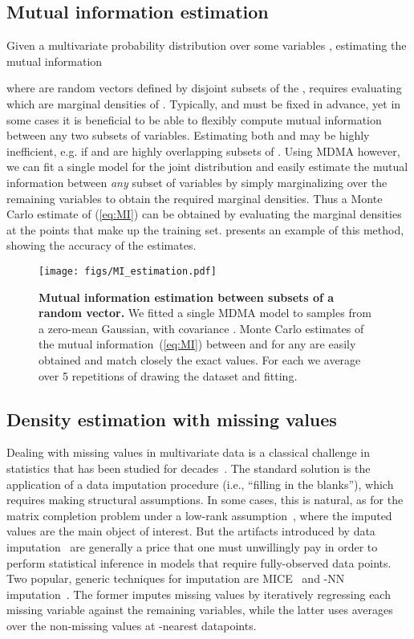 \documentclass{article}
\begin{document}
\subsection{Mutual information estimation}
Given a multivariate probability distribution over some variables , estimating the mutual information 

where  are random vectors defined by disjoint subsets of the , requires evaluating  which are marginal densities of . Typically,  and  must be fixed in advance, yet in some cases it is beneficial to be able to flexibly compute mutual information between any two subsets of variables. Estimating both  and  may be highly inefficient, e.g. if  and  are highly overlapping subsets of . 
Using MDMA however, we can fit a single model for the joint distribution
and easily estimate the mutual information between \textit{any} subset of variables by simply marginalizing over the remaining variables to obtain the required marginal densities. 
Thus a Monte Carlo estimate of (\ref{eq:MI}) can be obtained by evaluating the marginal densities at the points that make up the training set. 
 presents an example of this method, showing the accuracy of the estimates.
\begin{SCfigure}
    \centering
    \texttt{[image: figs/MI\_estimation.pdf]}
    \caption{\textbf{Mutual information estimation between subsets of a random vector.}
    We fitted a single MDMA model to samples from a zero-mean  Gaussian, with covariance . 
    Monte Carlo estimates of the mutual information~(\ref{eq:MI}) between 
      and  for any  are easily obtained and match closely the exact values.       For each  we average over 5 repetitions of drawing the dataset and fitting. 
}
    \label{fig:MI_est}
    \vspace{-.5in}
\end{SCfigure}


%
 

\subsection{Density estimation with missing values} \label{sec:demv}


Dealing with missing values in multivariate data is a classical challenge in statistics that has been studied for decades~\cite{little2019}.
The standard solution is the application of a data imputation procedure (i.e., ``filling in the blanks''), 
which requires making structural assumptions. 
In some cases, this is natural, as for the matrix completion problem under a low-rank assumption~\cite{candes2009exact, candes2010matrix}, where the imputed values are the main object of interest.
But the artifacts introduced by data imputation~\cite{beretta2016nearest}
are generally a price that one must 
unwillingly pay in order to perform statistical inference in models that require fully-observed data points.
Two popular, generic techniques for imputation are MICE~\cite{buuren2010mice} and -NN imputation~\cite{troyanskaya2001missing}.
The former imputes missing values by iteratively regressing each missing variable against the remaining variables, while the latter uses averages over the non-missing values at -nearest datapoints.
\end{document}
